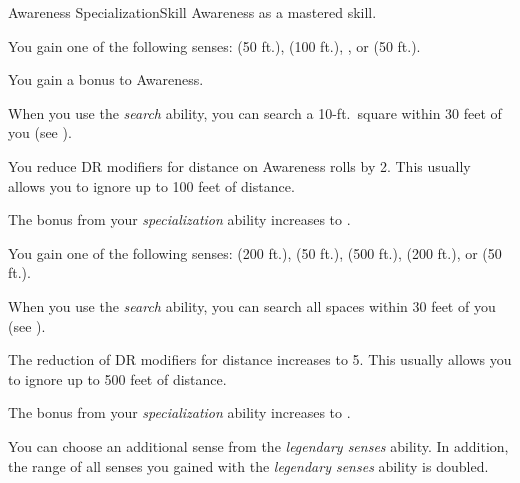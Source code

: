     \begin{feat}{Awareness Specialization}{Skill}
        \featpre Awareness as a mastered skill.

         You gain one of the following senses:  (50 ft.),  (100 ft.), , or  (50 ft.).

         You gain a  bonus to Awareness.

         When you use the \textit{search} ability, you can search a 10-ft.\ square within 30 feet of you (see ).

         You reduce DR modifiers for distance on Awareness rolls by 2.
        This usually allows you to ignore up to 100 feet of distance.


         The bonus from your \textit{specialization} ability increases to .

         You gain one of the following senses:  (200 ft.),  (50 ft.),  (500 ft.),  (200 ft.), or  (50 ft.).

         When you use the \textit{search} ability, you can search all spaces within 30 feet of you (see ).

         The reduction of DR modifiers for distance increases to 5.
        This usually allows you to ignore up to 500 feet of distance.

         The bonus from your \textit{specialization} ability increases to .

         You can choose an additional sense from the \textit{legendary senses} ability.
        In addition, the range of all senses you gained with the \textit{legendary senses} ability is doubled.
    \end{feat}

